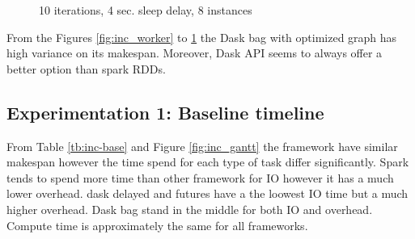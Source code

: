 \documentclass[11pt,a4paper]{article}
\begin{document}
\begin{figure}[htp]
    \centering
    
    \caption{10 iterations, 4 sec. sleep delay, 8 instances}
    \label{fig:inc_chunk}
\end{figure}

From the Figures \ref{fig:inc_worker} to \ref{fig:inc_chunk} the Dask bag with optimized graph
has high variance on its makespan. Moreover, Dask API seems to always offer a better
option than spark RDDs.

\subsection{Experimentation 1: Baseline timeline}
From Table \ref{tb:inc-base} and Figure \ref{fig:inc_gantt} the framework have
similar makespan however the time spend for each type of task differ significantly.
Spark tends to spend more time than other framework for IO however it has a much
lower overhead. dask delayed and futures have a the loowest IO time but a much higher
overhead. Dask bag stand in the middle for both IO and overhead. Compute time is
approximately the same for all frameworks.
\end{document}
